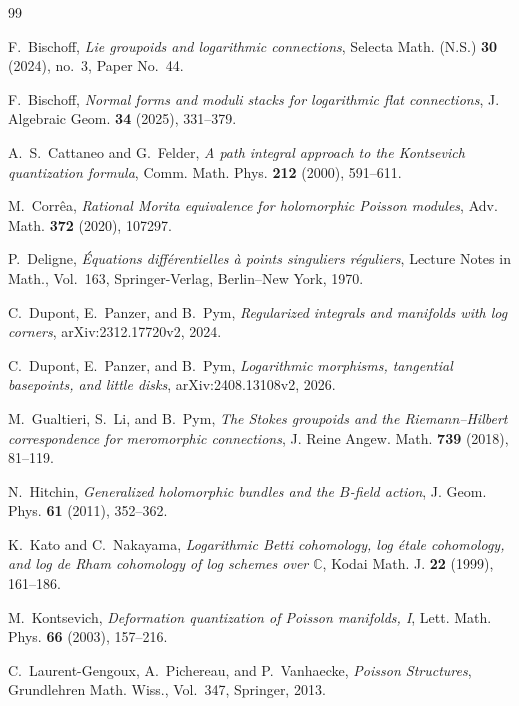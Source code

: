 \documentclass[11pt]{amsart}
\theoremstyle{plain}
\theoremstyle{definition}
\theoremstyle{definition}
\begin{document}

 
\begin{thebibliography}{99}

F.~Bischoff,
\emph{Lie groupoids and logarithmic connections},
Selecta Math. (N.S.) \textbf{30} (2024), no.~3, Paper No.~44.

F.~Bischoff,
\emph{Normal forms and moduli stacks for logarithmic flat connections},
J. Algebraic Geom. \textbf{34} (2025), 331--379.

A.~S.~Cattaneo and G.~Felder,
\emph{A path integral approach to the Kontsevich quantization formula},
Comm. Math. Phys. \textbf{212} (2000), 591--611.

M.~Corr\^ea,
\emph{Rational Morita equivalence for holomorphic Poisson modules},
Adv. Math. \textbf{372} (2020), 107297.

P.~Deligne,
\emph{\'Equations diff\'erentielles \`a points singuliers r\'eguliers},
Lecture Notes in Math., Vol.~163, Springer-Verlag, Berlin--New York, 1970.

C.~Dupont, E.~Panzer, and B.~Pym,
\emph{Regularized integrals and manifolds with log corners},
arXiv:2312.17720v2, 2024.

C.~Dupont, E.~Panzer, and B.~Pym,
\emph{Logarithmic morphisms, tangential basepoints, and little disks},
arXiv:2408.13108v2, 2026.

M.~Gualtieri, S.~Li, and B.~Pym,
\emph{The Stokes groupoids and the Riemann--Hilbert correspondence for meromorphic connections},
J. Reine Angew. Math. \textbf{739} (2018), 81--119.

N.~Hitchin,
\emph{Generalized holomorphic bundles and the $B$-field action},
J. Geom. Phys. \textbf{61} (2011), 352--362.

K.~Kato and C.~Nakayama,
\emph{Logarithmic Betti cohomology, log \'etale cohomology, and log de Rham cohomology of log schemes over $\mathbb{C}$},
Kodai Math. J. \textbf{22} (1999), 161--186.

M.~Kontsevich,
\emph{Deformation quantization of Poisson manifolds, I},
Lett. Math. Phys. \textbf{66} (2003), 157--216.

C.~Laurent-Gengoux, A.~Pichereau, and P.~Vanhaecke,
\emph{Poisson Structures},
Grundlehren Math. Wiss., Vol.~347, Springer, 2013.


\end{thebibliography}
\end{document}
